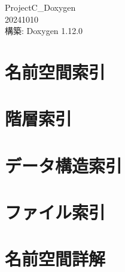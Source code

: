 \documentclass[twoside]{book}
\newcommand{\+}{\discretionary{\mbox{\scriptsize$\hookleftarrow$}}{}{}}
\newcommand{\clearemptydoublepage}{%
    \newpage{\pagestyle{empty}\cleardoublepage}%
  }
\begin{document}
  \raggedbottom
  \begin{CJK}{UTF8}{min}
    \hypersetup{pageanchor=false,
                bookmarksnumbered=true,
                pdfencoding=unicode
               }
  \begin{titlepage}
  \vspace*{7cm}
  \begin{center}%
  {\Large Project\+C\+\_\+\+Doxygen}\\
  [1ex]\large 20241010 \\
  \vspace*{1cm}
  {\large 構築\+: Doxygen 1.12.0}\\
  \end{center}
  \end{titlepage}
  \clearemptydoublepage
  \tableofcontents
  \clearemptydoublepage
  \hypersetup{pageanchor=true}

\chapter{名前空間索引}

\chapter{階層索引}

\chapter{データ構造索引}

\chapter{ファイル索引}

\chapter{名前空間詳解}


























\end{CJK}
\end{document}
